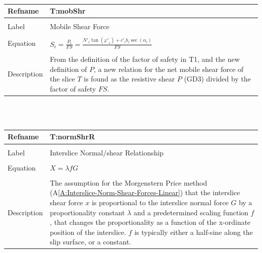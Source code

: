 \documentclass[12pt]{article}
\begin{document}
~\newline
\noindent \begin{minipage}{\textwidth}
\begin{tabular}{p{} p{}}
\toprule \textbf{Refname} & \textbf{T:mobShr}
\label{T:mobShr}
\\ \midrule \\
Label & Mobile Shear Force
\\ \midrule \\
Equation & $S_{i}=\frac{P_{i}}{FS}=\frac{{N'}_{i} \tan\left({φ'}_{i}\right)+{c'}_{i} b_{i} \sec\left(α_{i}\right)}{FS}$
\\ \midrule \\
Description & From the definition of the factor of safety in T1, and the new definition of $P$, a new relation for the net mobile shear force of the slice $T$ is found as the resistive shear $P$ (GD3) divided by the factor of safety $FS$.
\\ \bottomrule \end{tabular}
\end{minipage}\\
~\newline
\noindent \begin{minipage}{\textwidth}
\begin{tabular}{p{} p{}}
\toprule \textbf{Refname} & \textbf{T:normShrR}
\label{T:normShrR}
\\ \midrule \\
Label & Interslice Normal/shear Relationship
\\ \midrule \\
Equation & $X=λ f G$
\\ \midrule \\
Description & The assumption for the Morgenstern Price method (A\ref{A:Interslice-Norm-Shear-Forces-Linear}) that the interslice shear force $x$ is proportional to the interslice normal force $G$ by a proportionality constant $λ$ and a predetermined scaling function $f$, that changes the proportionality as a function of the x-ordinate position of the interslice. $f$ is typically either a half-sine along the slip surface, or a constant.
\\ \bottomrule \end{tabular}
\end{minipage}\\
~\newline
\end{document}
